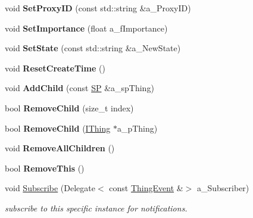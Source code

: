 \begin{DoxyCompactItemize}
void {\bfseries Set\+Proxy\+ID} (const std\+::string \&a\+\_\+\+Proxy\+ID)
\item 
\mbox{\label{class_i_thing_aac126276838b8e226a30c708f66d09e0}} 
void {\bfseries Set\+Importance} (float a\+\_\+f\+Importance)
\item 
\mbox{\label{class_i_thing_ac1ea9089d43a539b5e893040f4292412}} 
void {\bfseries Set\+State} (const std\+::string \&a\+\_\+\+New\+State)
\item 
\mbox{\label{class_i_thing_a793abe2b628db2e9c17681d60d02b7e8}} 
void {\bfseries Reset\+Create\+Time} ()
\item 
\mbox{\label{class_i_thing_a75127988982b18ca401ef541c1d8fcd0}} 
void {\bfseries Add\+Child} (const \hyperlink{class_i_thing_a6e95654aef6362c48b9a2fd44a1f970a}{SP} \&a\+\_\+sp\+Thing)
\item 
\mbox{\label{class_i_thing_aa772479067d50ec632e1b91e543dbaa4}} 
bool {\bfseries Remove\+Child} (size\+\_\+t index)
\item 
\mbox{\label{class_i_thing_a522c9b8aa9fc24082d774809e552b19b}} 
bool {\bfseries Remove\+Child} (\hyperlink{class_i_thing}{I\+Thing} $\ast$a\+\_\+p\+Thing)
\item 
\mbox{\label{class_i_thing_a22a9d457faa85cea50186790ca9734da}} 
void {\bfseries Remove\+All\+Children} ()
\item 
\mbox{\label{class_i_thing_ab234f8b3005b1ae366bff118d260ce6c}} 
bool {\bfseries Remove\+This} ()
\item 
\mbox{\label{class_i_thing_ac53deef9ffbfb6446116ea42cf13f323}} 
void \hyperlink{class_i_thing_ac53deef9ffbfb6446116ea42cf13f323}{Subscribe} (Delegate$<$ const \hyperlink{class_thing_event}{Thing\+Event} \&$>$ a\+\_\+\+Subscriber)
\begin{DoxyCompactList}\small\item\em subscribe to this specific instance for notifications. \end{DoxyCompactList}\item 
\mbox{\label{class_i_thing_a18dba6c237eb354160e9d97d68ad1bd3}} 

\end{DoxyCompactItemize}
